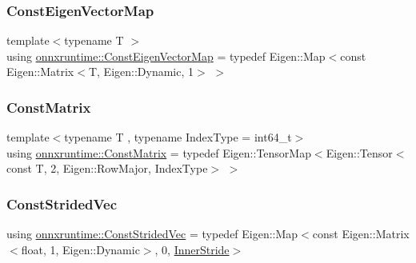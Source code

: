 \mbox{\label{namespaceonnxruntime_a16eca66228ee3a40fe3ae89db53e08ee}} 
\subsubsection{\texorpdfstring{Const\+Eigen\+Vector\+Map}{ConstEigenVectorMap}}
{\footnotesize\ttfamily template$<$typename T $>$ \\
using \mbox{\hyperlink{namespaceonnxruntime_a16eca66228ee3a40fe3ae89db53e08ee}{onnxruntime\+::\+Const\+Eigen\+Vector\+Map}} = typedef Eigen\+::\+Map$<$const Eigen\+::\+Matrix$<$T, Eigen\+::\+Dynamic, 1$>$ $>$}

\mbox{\label{namespaceonnxruntime_ac83412fba3bc8df9b710483ee958e79c}} 
\subsubsection{\texorpdfstring{Const\+Matrix}{ConstMatrix}}
{\footnotesize\ttfamily template$<$typename T , typename Index\+Type  = int64\+\_\+t$>$ \\
using \mbox{\hyperlink{namespaceonnxruntime_ac83412fba3bc8df9b710483ee958e79c}{onnxruntime\+::\+Const\+Matrix}} = typedef Eigen\+::\+Tensor\+Map$<$Eigen\+::\+Tensor$<$const T, 2, Eigen\+::\+Row\+Major, Index\+Type$>$ $>$}

\mbox{\label{namespaceonnxruntime_a8b34a40056623cbec4789c53d1381d82}} 
\subsubsection{\texorpdfstring{Const\+Strided\+Vec}{ConstStridedVec}}
{\footnotesize\ttfamily using \mbox{\hyperlink{namespaceonnxruntime_a8b34a40056623cbec4789c53d1381d82}{onnxruntime\+::\+Const\+Strided\+Vec}} = typedef Eigen\+::\+Map$<$const Eigen\+::\+Matrix$<$float, 1, Eigen\+::\+Dynamic$>$, 0, \mbox{\hyperlink{namespaceonnxruntime_aa66c7d9fd2b2c4d713447da3d8f7aa8e}{Inner\+Stride}}$>$}

